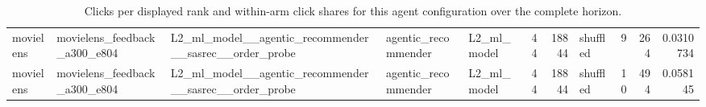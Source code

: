 \begin{table}[htbp!]
\begin{tabular}{lllllrrlrrr}
movielens & movielens\_feedback\_a300\_e804 & L2\_ml\_model\_\_agentic\_recommender\_\_sasrec\_\_order\_probe & agentic\_recommender & L2\_ml\_model & 44 & 18844 & shuffled & 9 & 264 & 0.0310734 \\
movielens & movielens\_feedback\_a300\_e804 & L2\_ml\_model\_\_agentic\_recommender\_\_sasrec\_\_order\_probe & agentic\_recommender & L2\_ml\_model & 44 & 18844 & shuffled & 10 & 494 & 0.058145 \\
\hline
\end{tabular}
\caption{Clicks per displayed rank and within-arm click shares for this agent configuration over the complete horizon.}
\label{chap:results:tab:rq3_rank_counts_l2_ml_model_agentic_recommender_sasrec_order_probe}
\end{table}
